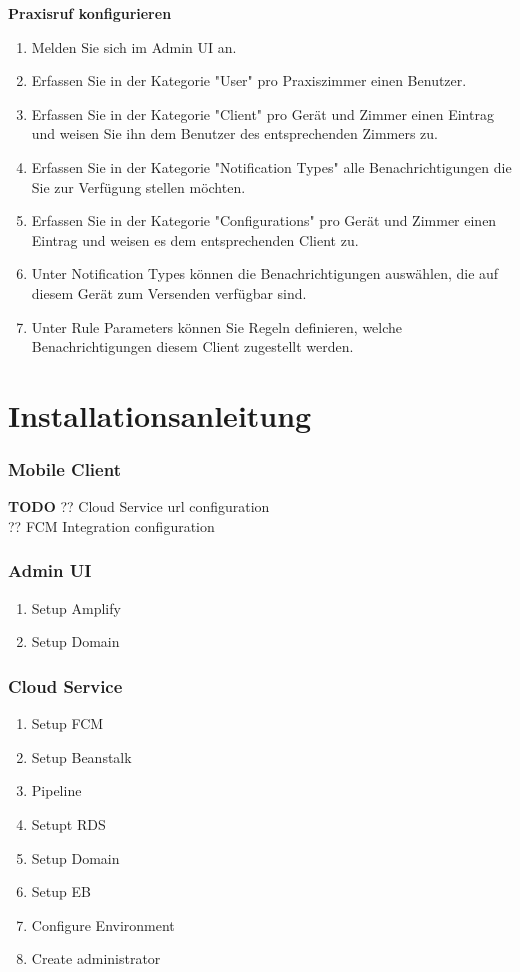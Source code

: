 \textbf{Praxisruf konfigurieren}
\begin{enumerate}
    \item Melden Sie sich im Admin UI an.
    \item Erfassen Sie in der Kategorie "User" pro Praxiszimmer einen Benutzer.
    \item Erfassen Sie in der Kategorie "Client" pro Gerät und Zimmer einen Eintrag und weisen Sie ihn dem Benutzer des entsprechenden Zimmers zu.
    \item Erfassen Sie in der Kategorie "Notification Types" alle Benachrichtigungen die Sie zur Verfügung stellen möchten.
    \item Erfassen Sie in der Kategorie "Configurations" pro Gerät und Zimmer einen Eintrag und weisen es dem entsprechenden Client zu.
    \item Unter Notification Types können die Benachrichtigungen auswählen, die auf diesem Gerät zum Versenden verfügbar sind.
    \item Unter Rule Parameters können Sie Regeln definieren, welche Benachrichtigungen diesem Client zugestellt werden.
\end{enumerate}


\section{Installationsanleitung}

\subsubsection*{Mobile Client}
\textbf{TODO}
?? Cloud Service url configuration \\
?? FCM Integration configuration \\

\subsubsection*{Admin UI}
\begin{enumerate}
    \item Setup Amplify
    \item Setup Domain
\end{enumerate}

\subsubsection*{Cloud Service}

\begin{enumerate}
    \item Setup FCM
    \item Setup Beanstalk
    \item Pipeline
    \item Setupt RDS
    \item Setup Domain
    \item Setup EB
    \item Configure Environment
    \item Create administrator
\end{enumerate}

